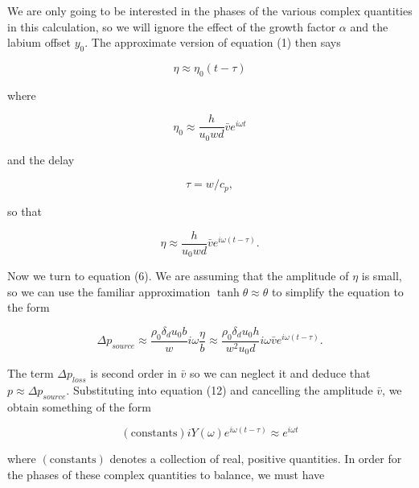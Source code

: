   We are only going to be interested in the phases of the various complex 
  quantities in this calculation, so we will ignore the effect of the growth 
  factor $\alpha$ and the labium offset $y_0$. The approximate version of 
  equation (1) then says 

  \begin{equation*}\eta \approx \eta_0(t-\tau) \tag{13}\end{equation*} 

  \noindent{}where 

  \begin{equation*}\eta_0 \approx \dfrac{h}{u_0 w d} \bar{v} e^{i \omega t} 
  \tag{14}\end{equation*} 

  \noindent{}and the delay 

  \begin{equation*}\tau=w/c_p, \tag{15}\end{equation*} 

  \noindent{}so that 

  \begin{equation*}\eta \approx \dfrac{h}{u_0 w d} \bar{v} e^{i \omega 
  (t-\tau)} . \tag{16}\end{equation*} 

  Now we turn to equation (6). We are assuming that the amplitude of $\eta$ is 
  small, so we can use the familiar approximation $\tanh \theta \approx \theta$ 
  to simplify the equation to the form 

  \begin{equation*}\Delta p_{source} \approx \dfrac{\rho_0 \delta_d u_0 b}{w} i 
  \omega \dfrac{\eta}{b} \approx \dfrac{\rho_0 \delta_d u_0 h}{w^2 u_0 d} i 
  \omega \bar{v} e^{i \omega (t-\tau)} . \tag{17}\end{equation*} 

  The term $\Delta p_{loss}$ is second order in $\bar{v}$ so we can neglect it 
  and deduce that $p \approx \Delta p_{source}$. Substituting into equation 
  (12) and cancelling the amplitude $\bar{v}$, we obtain something of the form 

  \begin{equation*}(\mathrm{constants})i Y(\omega) e^{i \omega (t-\tau)} 
  \approx e^{i \omega t} \tag{18}\end{equation*} 

  \noindent{}where $(\mathrm{constants})$ denotes a collection of real, 
  positive quantities. In order for the phases of these complex quantities to 
  balance, we must have 

